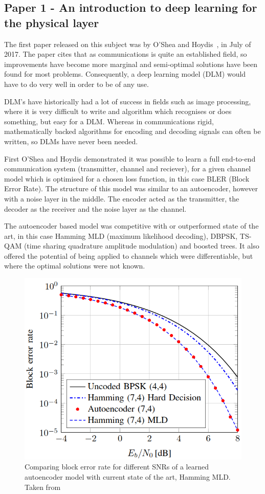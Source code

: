 \documentclass[12pt,onecolumn,letterpaper]{article}
\begin{document}
\subsection{Paper 1 - An introduction to deep learning for the physical layer}

The first paper released on this subject was by O'Shea and Hoydis~\cite{oShea}, in July of 2017. The paper cites that as communications is quite an established field, so improvements have become more marginal and semi-optimal solutions have been found for most problems. Consequently, a deep learning model (DLM) would have to do very well in order to be of any use. 

DLM’s have historically had a lot of success in fields such as image processing, where it is very difficult to write and algorithm which recognises or does something, but easy for a DLM. Whereas in communications rigid, mathematically backed algorithms for encoding and decoding signals can often be written, so DLMs have never been needed.

First O'Shea and Hoydis demonstrated it was possible to learn a full end-to-end communication system (transmitter, channel and reciever), for a given channel model which is optimised for a chosen loss function, in this case BLER (Block Error Rate). The structure of this model was similar to an autoencoder, however with a noise layer in the middle. The encoder acted as the transmitter, the decoder as the receiver and the noise layer as the channel.

The autoencoder based model was competitive with or outperformed state of the art, in this case Hamming MLD (maximum likelihood decoding), DBPSK, TS-QAM (time sharing quadrature amplitude modulation) and boosted trees. It also offered the potential of being applied to channels which were differentiable, but where the optimal solutions were not known. 

\begin{figure}[t]
\begin{center}
   \includegraphics[width=0.8\linewidth]{figures/oShea_autoencoder_hamming_comp.PNG}
\end{center}
   \caption{Comparing block error rate for different SNRs of a learned autoencoder model with current state of the art, Hamming MLD. Taken from~\cite{oShea}}
\label{fig:oSheaAutoencoderHamming}
\end{figure}
\end{document}
